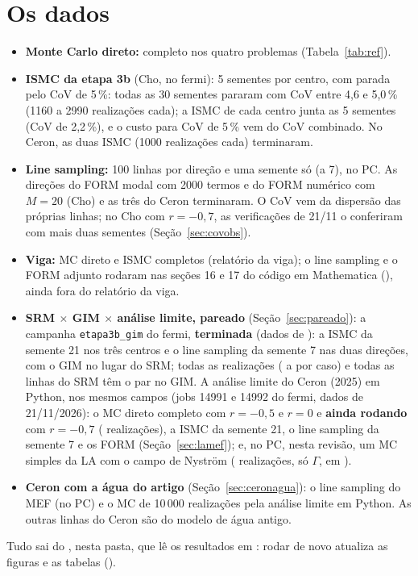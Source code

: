 \documentclass[11pt,a4paper]{article}
\begin{document}
\section{Os dados}
\begin{itemize}
  \item \textbf{Monte Carlo direto:} completo nos quatro problemas (Tabela~\ref{tab:ref}).
  \item \textbf{ISMC da etapa 3b} (Cho, no fermi): 5 sementes por centro, com parada
    pelo CoV de 5\,\%: todas as 30 sementes pararam com CoV entre 4,6 e 5,0\,\% (1160 a 2990 realizações cada); a
    ISMC de cada centro junta as 5 sementes (CoV de 2,2\,\%), e o custo para CoV de 5\,\% vem do CoV combinado.
    No Ceron, as duas ISMC (1000 realizações cada) terminaram.
  \item \textbf{Line sampling:} 100 linhas por direção e uma semente só (a 7), no PC. As direções do FORM modal com 2000
    termos e do FORM numérico com $M = 20$ (Cho) e as três do Ceron terminaram. O CoV vem da dispersão das próprias
    linhas; no Cho com $r = -0{,}7$, as verificações de 21/11 o conferiram com mais duas sementes
    (Seção~\ref{sec:covobs}).
  \item \textbf{Viga:} MC direto e ISMC completos (relatório da viga); o line sampling e o FORM adjunto rodaram nas seções
    16 e 17 do código em Mathematica (), ainda fora do relatório da
    viga.
  \item \textbf{SRM $\times$ GIM $\times$ análise limite, pareado} (Seção~\ref{sec:pareado}): a campanha
    \texttt{etapa3b\_gim} do fermi, \textbf{terminada} (dados de \sgData): a ISMC da semente 21 nos três centros e o
    line sampling da semente 7 nas duas direções, com o GIM no lugar do SRM; todas as realizações (\sgNmin{} a
    \sgNmax{} por caso) e todas as linhas do SRM têm o par no GIM. A análise limite do Ceron (2025) em Python, nos
    mesmos campos (jobs 14991 e 14992 do fermi, dados de 21/11/2026): o MC direto completo com $r = -0{,}5$ e $r = 0$ e
    \textbf{ainda rodando} com $r = -0{,}7$ (\lmDirRbN{} realizações), a ISMC da semente 21, o line sampling da semente
    7 e os FORM (Seção~\ref{sec:lamef}); e, no PC, nesta revisão, um MC simples da LA com o campo de Nyström
    (\lnyN{} realizações, só $\Gamma$, em ).
  \item \textbf{Ceron com a água do artigo} (Seção~\ref{sec:ceronagua}): o line sampling do MEF (no PC) e o MC de
    10\,000 realizações pela análise limite em Python. As outras linhas do Ceron são do modelo de água antigo.
\end{itemize}
Tudo sai do , nesta pasta, que lê os resultados em : rodar de novo atualiza as
figuras e as tabelas ().
\end{document}
